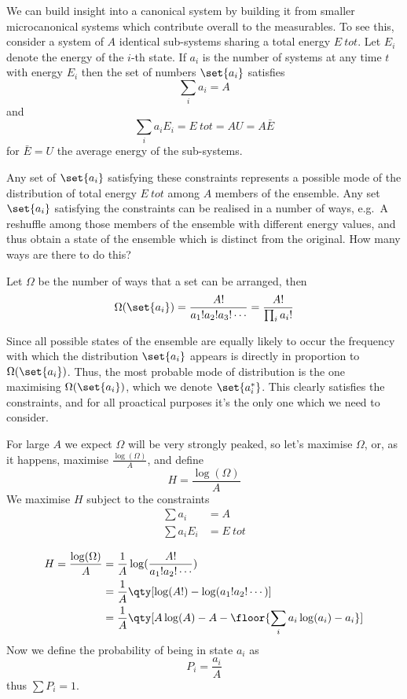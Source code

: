 We can build insight into a canonical system by building it from
smaller microcanonical systems which contribute overall to the
measurables. To see this, consider a system of $A$ identical
sub-systems sharing a total energy $E~{tot}$. Let $E_i$ denote the
energy of the $i$-th state. If $a_i$ is the number of systems at any
time $t$ with energy $E_i$ then the set of numbers $\set{a_i}$ satisfies 
\[ \sum_i a_i = A \]
and
\[ \sum_i a_i E_i = E~{tot} = AU = A \bar{E} \] for $\bar{E} = U$ the
average energy of the sub-systems.

Any set of $\set{a_i}$ satisfying these constraints represents a
possible mode of the distribution of total energy $E~{tot}$ among $A$
members of the ensemble. Any set $\set{a_i}$ satisfying the
constraints can be realised in a number of ways, e.g.~A reshuffle
among those members of the ensemble with different energy values, and
thus obtain a state of the ensemble which is distinct from the
original. How many ways are there to do this?

Let $\Omega$ be the number of ways that a set can be arranged, then
\begin{equation}
  \label{eq:1}
  \Omega(\set{a_i}) = \frac{A!}{a_1! a_2! a_3! \cdots} = \frac{A!}{\prod_i a_i!}
\end{equation}

Since all possible states of the ensemble are equally likely to occur
the frequency with which the distribution $\set{a_i}$ appears is
directly in proportion to $\Omega(\set{a_i})$. Thus, the most probable
mode of distribution is the one maximising $\Omega(\set{a_i})$, which
we denote $\set{a_i^{*}}$. This clearly satisfies the constraints, and
for all proactical purposes it's the only one which we need to
consider.

For large $A$ we expect $\Omega$ will be very strongly peaked, so
let's maximise $\Omega$, or, as it happens, maximise
$\frac{\log(\Omega)}{A}$, and define
\[ H = \frac{\log(\Omega)}{A} \]
We maximise $H$ subject to the constraints
\begin{subequations}
\begin{align}
  \sum a_i &= A \\
\sum a_i E_i &= E~{tot}
\end{align}
\end{subequations}

\begin{align*}
  H = \frac{\log(\Omega)}{A} &= \frac{1}{A} \log( \frac{A!}{a_1! a_2! \cdots}) \\
&= \frac{1}{A} \qty[ \log(A!) - \log(a_1! a_2! \cdots)]\\
&= \frac{1}{A} \qty[ A \log(A) - A - \floor{\sum_i a_i \log(a_i) - a_i}]
\end{align*}
Now we define the probability of being in state $a_i$ as 
\[ P_i = \frac{a_i}{A} \]
thus $\sum P_i = 1$.

